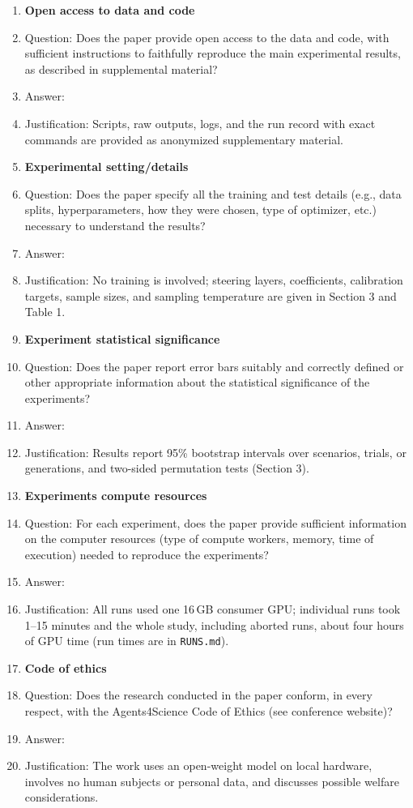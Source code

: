 \documentclass{article}
\newcommand{\code}[1]{\texttt{#1}}
\begin{document}
\begin{enumerate}
\item {\bf Open access to data and code}
    \item[] Question: Does the paper provide open access to the data and code, with sufficient instructions to faithfully reproduce the main experimental results, as described in supplemental material?
    \item[] Answer: \answerYes{}
    \item[] Justification: Scripts, raw outputs, logs, and the run record with exact commands are provided as anonymized supplementary material.

\item {\bf Experimental setting/details}
    \item[] Question: Does the paper specify all the training and test details (e.g., data splits, hyperparameters, how they were chosen, type of optimizer, etc.) necessary to understand the results?
    \item[] Answer: \answerYes{}
    \item[] Justification: No training is involved; steering layers, coefficients, calibration targets, sample sizes, and sampling temperature are given in Section 3 and Table 1.

\item {\bf Experiment statistical significance}
    \item[] Question: Does the paper report error bars suitably and correctly defined or other appropriate information about the statistical significance of the experiments?
    \item[] Answer: \answerYes{}
    \item[] Justification: Results report 95\% bootstrap intervals over scenarios, trials, or generations, and two-sided permutation tests (Section 3).

\item {\bf Experiments compute resources}
    \item[] Question: For each experiment, does the paper provide sufficient information on the computer resources (type of compute workers, memory, time of execution) needed to reproduce the experiments?
    \item[] Answer: \answerYes{}
    \item[] Justification: All runs used one 16\,GB consumer GPU; individual runs took 1--15 minutes and the whole study, including aborted runs, about four hours of GPU time (run times are in \code{RUNS.md}).

\item {\bf Code of ethics}
    \item[] Question: Does the research conducted in the paper conform, in every respect, with the Agents4Science Code of Ethics (see conference website)?
    \item[] Answer: \answerYes{}
    \item[] Justification: The work uses an open-weight model on local hardware, involves no human subjects or personal data, and discusses possible welfare considerations.


\end{enumerate}
\end{document}
